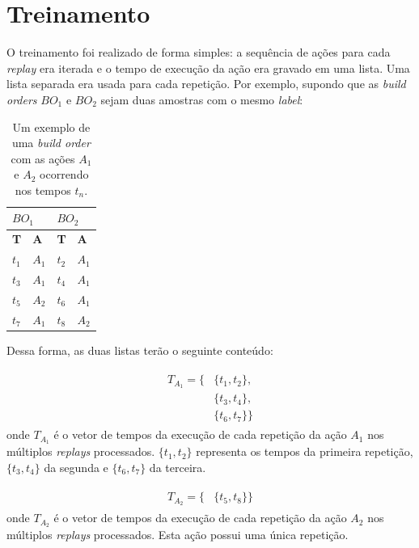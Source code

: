 \section{Treinamento}

O treinamento foi realizado de forma simples: a sequência de ações para cada \textit{replay} era iterada e o tempo de execução da ação era gravado em uma lista. Uma lista separada era usada para cada repetição. Por exemplo, supondo que as \textit{build orders} $BO_1$ e $BO_2$ sejam duas amostras com o mesmo \textit{label}:

\begin{table}[H]
\centering
\caption{Um exemplo de uma \textit{build order} com as ações $A_1$ e $A_2$ ocorrendo nos tempos $t_n$.}
\label{my-label}
\begin{tabular}{|l|l||l|l|}
\hline
\multicolumn{2}{|l||}{\centering $BO_1$} & \multicolumn{2}{l|}{\centering $BO_2$} \\ \hline
\textbf{T}  & \textbf{A}  & \textbf{T}  & \textbf{A} \\ \hline
$t_1$       & $A_1$       & $t_2$       & $A_1$      \\ \hline
$t_3$       & $A_1$       & $t_4$       & $A_1$      \\ \hline
$t_5$       & $A_2$       & $t_6$       & $A_1$      \\ \hline
$t_7$       & $A_1$       & $t_8$       & $A_2$      \\ \hline
\end{tabular}
\end{table}

Dessa forma, as duas listas terão o seguinte conteúdo:

\begin{align}
\begin{split}
    T_{A_1} = \{
		&\{t_1, t_2\}, 		\\
		&\{t_3, t_4\}, 		\\
		&\{t_6, t_7\}
	\}
\end{split}
\label{eq:metodo-exemplo-vetor-tempos-a1}
\end{align}
\noindent onde $T_{A_1}$ é o vetor de tempos da execução de cada repetição da ação $A_1$ nos múltiplos \textit{replays} processados. $\{t_1, t_2\}$ representa os tempos da primeira repetição, $\{t_3, t_4\}$ da segunda e $\{t_6, t_7\}$ da terceira.

\begin{align}
\begin{split}
    T_{A_2} = \{
		&\{t_5, t_8\}
	\}
\end{split}
\label{eq:metodo-exemplo-vetor-tempos-a2}
\end{align}
\noindent onde $T_{A_2}$ é o vetor de tempos da execução de cada repetição da ação $A_2$ nos múltiplos \textit{replays} processados. Esta ação possui uma única repetição.

